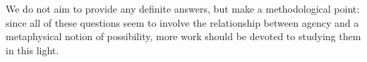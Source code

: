 \documentclass{article}
\begin{document}
We do not aim to provide any definite answers, but make a methodological point: since all of these questions seem to involve the relationship between agency and a metaphysical notion of possibility, more work should be devoted to studying them in this light.



\end{document}
